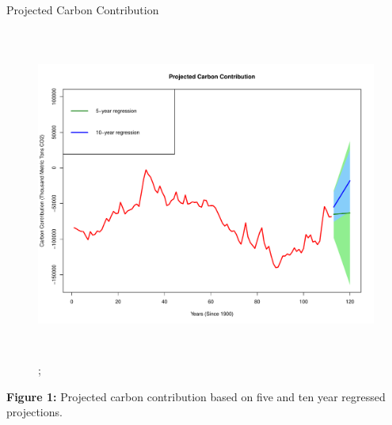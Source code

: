 \documentclass[final]{beamer}\usepackage[]{graphicx}\usepackage[]{color}
\newlength{\onecolwid}
\newlength{\twocolwid}
\begin{document}
\begin{frame}[t]
\begin{columns}[t]
\begin{column}{\twocolwid}
\begin{columns}[t,totalwidth=\twocolwid]
\begin{column}{\onecolwid}\vspace{-.6in} %

\begin{block}{Projected Carbon Contribution}
\begin{figure}
    {\includegraphics[width=1\linewidth,height=11cm]{projection.png}};
\end{figure}
{\bf Figure 1:} Projected carbon contribution based on five and ten year regressed projections.
\end{block}


\end{column} %

\end{columns} %



\end{column}
\end{columns}
\end{frame}
\end{document}
